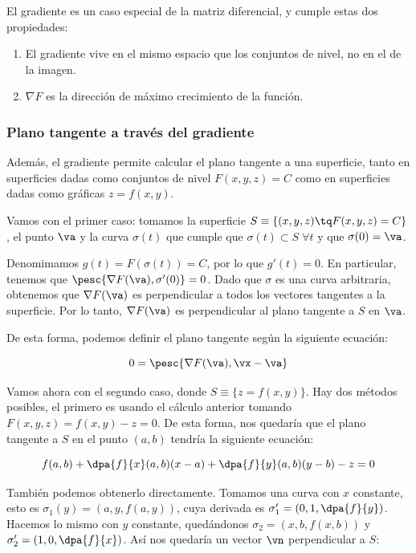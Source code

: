 \documentclass[nochap]{apuntes}
\begin{document}
El gradiente es un caso especial de la matriz diferencial, y cumple estas dos propiedades:

\begin{enumerate}
\item El gradiente vive en el mismo espacio que los conjuntos de nivel, no en el de la imagen.
\item $\nabla F$ es la dirección de máximo crecimiento de la función.
\end{enumerate}

\subsubsection{Plano tangente a través del gradiente}
Además, el gradiente permite calcular el plano tangente a una superficie, tanto en superficies dadas como conjuntos de nivel $F(x,y,z) = C$ como en superficies dadas como gráficas $z=f(x,y)$. 

Vamos con el primer caso: tomamos la superficie $S\equiv \{(x,y,z) \tq F(x,y,z) = C\}$, el punto $\va$ y la curva $\sigma (t)$ que cumple que $\sigma (t) \subset S \; \forall t$ y que $\sigma (0) = \va$.

Denomimamos $g(t) = F(\sigma(t)) = C$, por lo que $g'(t) =0$. En particular, tenemos que $\pesc{\nabla F (\va), \sigma ' (0)}= 0$. Dado que $\sigma$ es una curva arbitraria, obtenemos que $\nabla F (\va)$ es perpendicular a todos los vectores tangentes a la superficie. Por lo tanto, $\nabla F (\va)$ es perpendicular al plano tangente a $S$ en $\va$.

De esta forma, podemos definir el plano tangente según la siguiente ecuación:

\[ 0 =\pesc{\nabla F(\va),\vx -\va} \]

Vamos ahora con el segundo caso, donde $S\equiv \{z=f(x,y) \}$. Hay dos métodos posibles, el primero es usando el cálculo anterior tomando $F(x,y,z) = f(x,y) - z = 0$. De esta forma, nos quedaría que el plano tangente a $S$ en el punto $(a,b)$ tendría la siguiente ecuación:

\[ f(a,b) + \dpa{f}{x} (a,b) (x-a)+\dpa{f}{y}(a,b) (y-b) - z = 0 \]

También podemos obtenerlo directamente. Tomamos una curva con $x$ constante, esto es $\sigma_1(y) = (a,y, f(a,y))$, cuya derivada es $\sigma_1'=(0,1,\dpa{f}{y})$. Hacemos lo mismo con $y$ constante, quedándonos $\sigma_2 = (x, b, f(x,b))$ y $\sigma_2 ' = (1, 0, \dpa{f}{x})$. Así nos quedaría un vector $\vn$ perpendicular a $S$:
\end{document}
